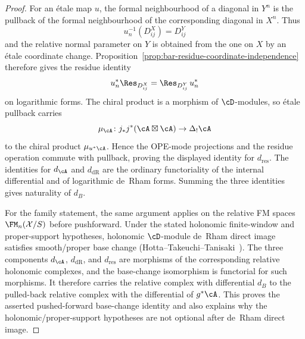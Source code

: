 \begin{proof}
For an \'{e}tale map \(u\), the formal neighbourhood of a diagonal in
\(Y^n\) is the pullback of the formal neighbourhood of the corresponding
diagonal in \(X^n\). Thus
\[
u_n^{-1}(D^X_{ij})=D^Y_{ij}
\]
and the relative normal parameter on \(Y\) is obtained from the one on
\(X\) by an \'{e}tale coordinate change. Proposition~\ref{prop:bar-residue-coordinate-independence}
therefore gives the residue identity
\[
u_n^*\Res_{D^X_{ij}}=\Res_{D^Y_{ij}}\,u_n^*
\]
on logarithmic forms. The chiral product is a morphism of
\(\cD\)-modules, so \'{e}tale pullback carries
\[
\mu_{\cA}\colon j_*j^*(\cA\boxtimes\cA)\to\Delta_!\cA
\]
to the chiral product \(\mu_{u^*\cA}\). Hence the OPE-mode projections
and the residue operation commute with pullback, proving the displayed
identity for \(d_{\mathrm{res}}\). The identities for \(d_\cA\) and
\(d_{\mathrm{dR}}\) are the ordinary functoriality of the internal
differential and of logarithmic de~Rham forms. Summing the three
identities gives naturality of \(d_B\).

For the family statement, the same argument applies on the relative FM
spaces \(\FM_n(\mathcal X/S)\) before pushforward. Under the stated
holonomic finite-window and proper-support hypotheses, holonomic
\(\cD\)-module de~Rham direct image satisfies smooth/proper base change
\textup{(}Hotta--Takeuchi--Tanisaki~\cite[\S1.7]{HTT08}\textup{)}.
The three components \(d_\cA\), \(d_{\mathrm{dR}}\), and
\(d_{\mathrm{res}}\) are morphisms of the corresponding relative
holonomic complexes, and the base-change isomorphism is functorial for
such morphisms. It therefore carries the relative complex with
differential \(d_B\) to the pulled-back relative complex with the
differential of \(g^*\cA\). This proves the asserted pushed-forward
base-change identity and also explains why the holonomic/proper-support
hypotheses are not optional after de~Rham direct image.
\end{proof}

